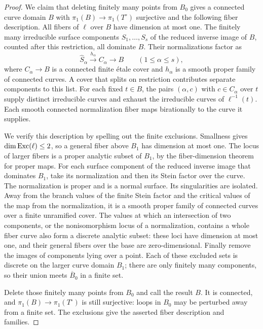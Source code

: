 \begin{proof}
We claim that deleting finitely many points from \(B_0\) gives a
connected curve domain \(B\) with
\(\pi_1(B)\to\pi_1(T^\circ)\) surjective and the following fiber
description.  All fibers of \(\ell\) over \(B\) have dimension at
most one.  The finitely many irreducible surface components
\(S_1,\ldots,S_s\) of the reduced inverse image of \(B\), counted
after this restriction, all dominate \(B\).  Their normalizations
factor as
\[
 \widehat S_\alpha\xrightarrow{\,h_\alpha\,}C_\alpha
 \longrightarrow B \qquad (1\le\alpha\le s),
\]
where \(C_\alpha\to B\) is a connected finite \'etale cover and
\(h_\alpha\) is a smooth proper family of connected curves.  A cover
that splits on restriction contributes separate components to this
list.  For each fixed \(t\in B\), the pairs \((\alpha,c)\) with
\(c\in C_\alpha\) over \(t\) supply distinct irreducible curves and
exhaust the irreducible curves of \(\ell^{-1}(t)\).  Each smooth
connected normalization fiber maps birationally to the curve it
supplies.

We verify this description by spelling out the finite exclusions.
Smallness gives \(\dim\operatorname{Exc}(\ell)\le2\), so a general fiber above
\(B_1\) has dimension at most one.  The locus of larger fibers is a
proper analytic subset of \(B_1\), by the fiber-dimension theorem
for proper maps.  For each surface component of the reduced inverse
image that dominates \(B_1\), take its normalization and then its Stein factor over the
curve.  The normalization is proper and is a normal surface.
Its singularities are isolated.  Away from the branch values of the
finite Stein factor and the critical values of the map from the
normalization, it is a smooth proper family of connected curves
over a finite unramified cover.  The values at which an intersection
of two components, or the nonisomorphism locus of a normalization,
contains a whole fiber curve also form a discrete analytic subset:
these loci have dimension at most one, and their general fibers
over the base are zero-dimensional.  Finally remove the images of
components lying over a point.  Each of these excluded sets is
discrete on the larger curve domain \(B_1\); there are only finitely
many components, so their union meets \(\overline B_0\) in a finite
set.

Delete those finitely many points from \(B_0\) and call the result
\(B\).  It is connected, and
\(\pi_1(B)\to\pi_1(T^\circ)\) is still surjective: loops in \(B_0\)
may be perturbed away from a finite set.  The exclusions give the
asserted fiber description and families.


\end{proof}
